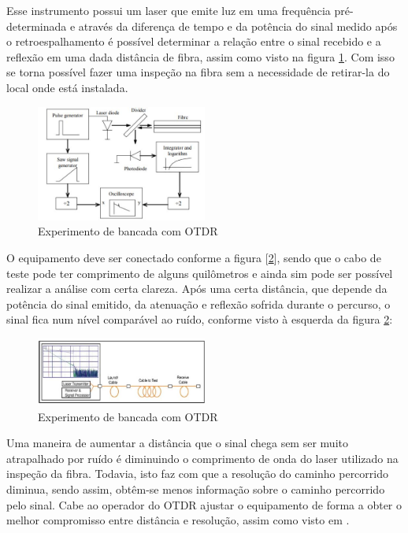 \documentclass[article]{IEEEtran}
\begin{document}
Esse instrumento possui um laser que emite luz em uma frequência pré-determinada e através da diferença de tempo e da potência do sinal medido após o retroespalhamento é possível determinar a relação entre o sinal recebido e a reflexão em uma dada distância de fibra, assim como visto na figura \ref{fig:otdr_esquematico}. Com isso se torna possível fazer uma inspeção na fibra sem a necessidade de retirar-la do local onde está instalada.


\begin{figure}[H]
	\includegraphics[width=0.5\textwidth]{images/OTDR_esquematico.JPG}
	\caption{Experimento de bancada com OTDR}
	\label{fig:otdr_esquematico}
\end{figure}

O equipamento deve ser conectado conforme a figura [\ref{fig:otdr_teste}], sendo que o cabo de teste pode ter comprimento de alguns quilômetros e ainda sim  pode ser possível realizar a análise com certa clareza. Após uma certa distância, que depende da potência do sinal emitido, da atenuação e reflexão sofrida durante o percurso, o sinal fica num nível comparável ao ruído, conforme visto à esquerda da figura \ref{fig:otdr_teste}:
\begin{figure}[H]
	\includegraphics[width=0.5\textwidth]{images/OTDR_teste.JPG}
	\caption{Experimento de bancada com OTDR}
	\label{fig:otdr_teste}
\end{figure}

Uma maneira de aumentar a distância que o sinal chega sem ser muito atrapalhado por ruído é diminuindo o comprimento de onda do laser utilizado na inspeção da fibra. Todavia, isto faz com que a resolução do caminho percorrido diminua, sendo assim, obtêm-se menos informação sobre o caminho percorrido pelo sinal. Cabe ao operador do OTDR ajustar o equipamento de forma a obter o melhor compromisso entre distância e resolução, assim como visto em \cite{OTDR_LAB}.
\end{document}
